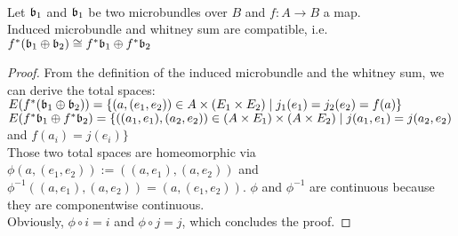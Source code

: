 \\ Let $\mathfrak{b}_1$ and $\mathfrak{b}_1$ be two microbundles over $B$ and $f: A \to B$ a map.
\\ Induced microbundle and whitney sum are compatible, i.e. $f^*(\mathfrak{b}_1 \oplus \mathfrak{b}_2) \cong f^*\mathfrak{b}_1 \oplus f^*\mathfrak{b}_2$
\begin{proof}
    From the definition of the induced microbundle and the whitney sum, we can derive the total spaces:
    \\ $E(f^*(\mathfrak{b}_1 \oplus \mathfrak{b}_2)) = \{(a, (e_1, e_2)) \in A \times (E_1 \times E_2) \mid j_1(e_1) = j_2(e_2) = f(a) \}$
    \\ $E(f^*\mathfrak{b}_1 \oplus f^*\mathfrak{b}_2) = \{((a_1, e_1), (a_2, e_2)) \in (A \times E_1) \times (A \times E_2) \mid j(a_1, e_1) = j(a_2, e_2)$ and $f(a_i) = j(e_i)\}$
    \\ Those two total spaces are homeomorphic via $\phi(a, (e_1, e_2)) := ((a, e_1), (a, e_2))$ and $\phi^{-1}((a, e_1), (a, e_2)) = (a, (e_1, e_2))$. $\phi$ and $\phi^{-1}$ are continuous because they are componentwise continuous.
    \\ Obviously, $\phi \circ i = i$ and $\phi \circ j = j$, which concludes the proof. 
\end{proof}